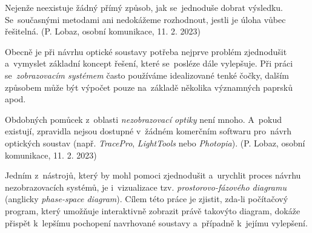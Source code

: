 Nejenže neexistuje žádný přímý způsob, jak se~jednoduše dobrat výsledku. Se~současnými metodami ani nedokážeme rozhodnout, jestli je úloha vůbec řešitelná. (P. Lobaz, osobní komunikace, 11. 2. 2023)

Obecně je při návrhu optické soustavy potřeba nejprve problém zjednodušit a~vymyslet základní koncept řešení, které se~posléze dále vylepšuje. Při práci se~\emph{zobrazovacím systémem} často používáme idealizované tenké čočky, dalším způsobem může být výpočet pouze na~základě několika významných paprsků apod.

Obdobných pomůcek z~oblasti \emph{nezobrazovací optiky} není mnoho. A~pokud existují, zpravidla nejsou dostupné v~žádném komerčním softwaru pro~návrh optických soustav (např. \emph{TracePro}, \emph{LightTools} nebo \emph{Photopia}). (P. Lobaz, osobní komunikace, 11. 2. 2023)

Jedním z~nástrojů, který by mohl pomoci zjednodušit a~urychlit proces návrhu nezobrazovacích systémů, je i~vizualizace tzv. \emph{prostorovo-fázového diagramu} (anglicky \emph{phase-space diagram}). \parencite{mushaveck2022designing} Cílem této práce je zjistit, zda-li počítačový program, který umožňuje interaktivně zobrazit právě takovýto diagram, dokáže přispět k~lepšímu pochopení navrhované soustavy a~případně k~jejímu vylepšení.